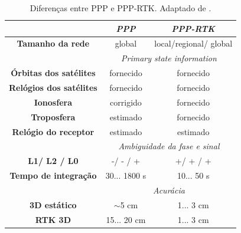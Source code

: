 \begin{table}[H]
\begin{center}
\begin{tabular}{c|c|c|}
\cline{2-3}
                                                      & \textbf{\textit{PPP}}            & \textbf{\textit{PPP-RTK}}                 \\ \hline
\multicolumn{1}{|c|}{\textbf{Tamanho da rede}}        & global                  & local/regional/	global           \\ \hline
                                                      & \multicolumn{2}{c|}{\textit{Primary state information}}    \\ \hline
\multicolumn{1}{|c|}{\textbf{Órbitas dos satélites}}  & fornecido               & fornecido                        \\ \hline
\multicolumn{1}{|c|}{\textbf{Relógios dos satélites}} & fornecido               & fornecido                        \\ \hline
\multicolumn{1}{|c|}{\textbf{Ionosfera}}              & corrigido               & fornecido                        \\ \hline
\multicolumn{1}{|c|}{\textbf{Troposfera}}             & estimado                & fornecido                        \\ \hline
\multicolumn{1}{|c|}{\textbf{Relógio do receptor}}    & estimado                & estimado                         \\ \hline
                                                      & \multicolumn{2}{c|}{\textit{Ambiguidade da fase e sinal}} \\ \hline
\multicolumn{1}{|c|}{\textbf{L1/ L2 / L0}}            & -/ - / +                & +/ + / +                         \\ \hline
\multicolumn{1}{|c|}{\textbf{Tempo de integração}}    & 30... 1800 s            & 10... 50 s                       \\ \hline
                                                      & \multicolumn{2}{c|}{\textit{Acurácia}}                     \\ \hline
\multicolumn{1}{|c|}{\textbf{3D estático}}            & $\sim$5 cm              & 1... 3 cm                        \\ \hline
\multicolumn{1}{|c|}{\textbf{RTK 3D}}                 & 15... 20 cm             & 1... 3 cm                        \\ \hline
\end{tabular}
\end{center}
\caption{Diferenças entre PPP e PPP-RTK. Adaptado de \cite{wubbena2005ppp}.}
\label{tableref}
\end{table}

